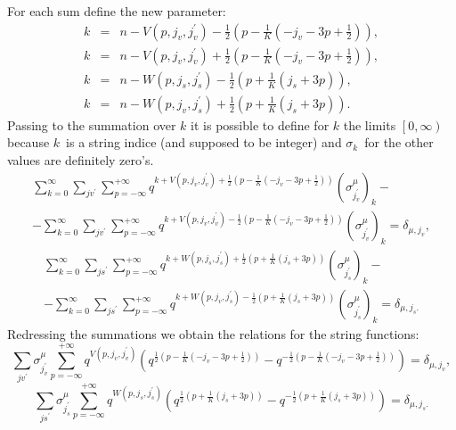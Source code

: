 \documentclass{article}
\begin{document}
For each sum define the new parameter:
\begin{eqnarray*}
k &=&n-V\left( p,j_{v},j_{v}^{\prime }\right) -\frac{1}{2}\left( p-\frac{1}{K%
}\left( -j_{v}-3p+\frac{1}{2}\right) \right) , \\
k &=&n-V\left( p,j_{v},j_{v}^{\prime }\right) +\frac{1}{2}\left( p-\frac{1}{K%
}\left( -j_{v}-3p+\frac{1}{2}\right) \right) , \\
k &=&n-W\left( p,j_{s},j_{s}^{\prime }\right) -\frac{1}{2}\left( p+\frac{1}{K%
}\left( j_{s}+3p\right) \right) , \\
k &=&n-W\left( p,j_{v},j_{s}^{\prime }\right) +\frac{1}{2}\left( p+\frac{1}{K%
}\left( j_{s}+3p\right) \right) .
\end{eqnarray*}
Passing to the summation over $k$ it is possible to define for $k$ the
limits $\left[ 0,\infty \right) $ because $k$\ is a string indice (and
supposed to be integer) and $\sigma _{k}$\ for the other values are
definitely zero's.
\begin{multline*}
\sum_{k=0}^{\infty }\sum_{jv^{\prime }}\sum_{p=-\infty }^{+\infty
}q^{k+V\left( p,j_{v},j_{v}^{\prime }\right) +\frac{1}{2}\left( p-\frac{1}{K}%
\left( -j_{v}-3p+\frac{1}{2}\right) \right) }\left( \sigma _{j_{v}^{\prime
}}^{\mu }\right) _{k}- \\
-\sum_{k=0}^{\infty }\sum_{jv^{\prime }}\sum_{p=-\infty }^{+\infty
}q^{k+V\left( p,j_{v},j_{v}^{\prime }\right) -\frac{1}{2}\left( p-\frac{1}{K}%
\left( -j_{v}-3p+\frac{1}{2}\right) \right) }\left( \sigma _{j_{v}^{\prime
}}^{\mu }\right) _{k}=\delta _{\mu ,j_{v}},
\end{multline*}
\begin{multline*}
\sum_{k=0}^{\infty }\sum_{js^{\prime }}\sum_{p=-\infty }^{+\infty
}q^{k+W\left( p,j_{s},j_{s}^{\prime }\right) +\frac{1}{2}\left( p+\frac{1}{K}%
\left( j_{s}+3p\right) \right) }\left( \sigma _{j_{s}^{\prime }}^{\mu
}\right) _{k}- \\
-\sum_{k=0}^{\infty }\sum_{js^{\prime }}\sum_{p=-\infty }^{+\infty
}q^{k+W\left( p,j_{v},j_{s}^{\prime }\right) -\frac{1}{2}\left( p+\frac{1}{K}%
\left( j_{s}+3p\right) \right) }\left( \sigma _{j_{s}^{\prime }}^{\mu
}\right) _{k}=\delta _{\mu ,j_{s}.}
\end{multline*}
Redressing the summations we obtain the relations for the string functions:
\begin{equation*}
\sum_{jv^{\prime }}\sigma _{j_{v}^{\prime }}^{\mu }\sum_{p=-\infty
}^{+\infty }q^{V\left( p,j_{v},j_{v}^{\prime }\right) }\left( q^{\frac{1}{2}%
\left( p-\frac{1}{K}\left( -j_{v}-3p+\frac{1}{2}\right) \right) }-q^{-\frac{1%
}{2}\left( p-\frac{1}{K}\left( -j_{v}-3p+\frac{1}{2}\right) \right) }\right)
=\delta _{\mu ,j_{v}},
\end{equation*}
\begin{equation*}
\sum_{js^{\prime }}\sigma _{j_{s}^{\prime }}^{\mu }\sum_{p=-\infty
}^{+\infty }q^{W\left( p,j_{s},j_{s}^{\prime }\right) }\left( q^{\frac{1}{2}%
\left( p+\frac{1}{K}\left( j_{s}+3p\right) \right) }-q^{-\frac{1}{2}\left( p+%
\frac{1}{K}\left( j_{s}+3p\right) \right) }\right) =\delta _{\mu ,j_{s}.}
\end{equation*}
\end{document}
